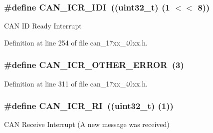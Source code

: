 \subsubsection[{\texorpdfstring{C\+A\+N\+\_\+\+I\+C\+R\+\_\+\+I\+DI}{CAN_ICR_IDI}}]{\setlength{\rightskip}{0pt plus 5cm}\#define C\+A\+N\+\_\+\+I\+C\+R\+\_\+\+I\+DI~((uint32\+\_\+t) (1 $<$$<$ 8))}\hypertarget{group__CAN__17XX__40XX_gab57b8c6d33827a856266f8340052ce84}{}\label{group__CAN__17XX__40XX_gab57b8c6d33827a856266f8340052ce84}
C\+AN ID Ready Interrupt 

Definition at line 254 of file can\+\_\+17xx\+\_\+40xx.\+h.

\subsubsection[{\texorpdfstring{C\+A\+N\+\_\+\+I\+C\+R\+\_\+\+O\+T\+H\+E\+R\+\_\+\+E\+R\+R\+OR}{CAN_ICR_OTHER_ERROR}}]{\setlength{\rightskip}{0pt plus 5cm}\#define C\+A\+N\+\_\+\+I\+C\+R\+\_\+\+O\+T\+H\+E\+R\+\_\+\+E\+R\+R\+OR~(3)}\hypertarget{group__CAN__17XX__40XX_ga99676739f4c76530af531657c2cdf4c2}{}\label{group__CAN__17XX__40XX_ga99676739f4c76530af531657c2cdf4c2}


Definition at line 311 of file can\+\_\+17xx\+\_\+40xx.\+h.

\subsubsection[{\texorpdfstring{C\+A\+N\+\_\+\+I\+C\+R\+\_\+\+RI}{CAN_ICR_RI}}]{\setlength{\rightskip}{0pt plus 5cm}\#define C\+A\+N\+\_\+\+I\+C\+R\+\_\+\+RI~((uint32\+\_\+t) (1))}\hypertarget{group__CAN__17XX__40XX_ga7d64f1d188b6121983be38f7d688c6d0}{}\label{group__CAN__17XX__40XX_ga7d64f1d188b6121983be38f7d688c6d0}
C\+AN Receive Interrupt (A new message was received) 

